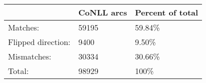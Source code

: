 	\begin{tabular}{|l|l|l|}
		\hline
		 & CoNLL arcs & Percent of total \\ 
		\hline
		Matches: & 59195 & 59.84\%\\ 
		\hline
		Flipped direction: & 9400 & 9.50\%\\ 
		\hline
		Mismatches: & 30334 & 30.66\%\\ 
		\hline
		Total: & 98929 & 100\% \\ 
		\hline
	\end{tabular}
